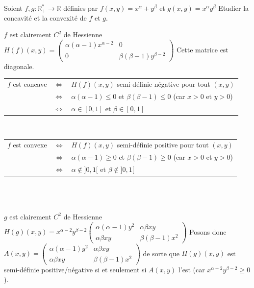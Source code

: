 \documentclass{fancybook}
\begin{document}
\begin{exercice}
Soient $f,g:\mathbb R^*_+\to \mathbb R$ définies par $f(x,y)=x^\alpha + y^\beta$ et $g(x,y)=x^{\alpha}y^{\beta}$\newline
Etudier la concavité et la convexité de $f$ et $g$.
\end{exercice}
$f$ est clairement $C^2$ de Hessienne $H(f)(x,y)=\begin{pmatrix}
\alpha(\alpha-1)x^{\alpha-2} & 0 \\
0 & \beta(\beta-1)y^{\beta-2}
\end{pmatrix}$\newline
Cette matrice est diagonale.\newline
\setlength{\tabcolsep}{0.1em}
\begin{tabular}{ccl}
$f$ est concave & $\iff$ & $H(f)(x,y)$ semi-définie négative pour tout $(x,y)$\\
& $\iff $ & $\alpha(\alpha-1)\leq 0$ et $\beta(\beta-1)\leq 0$ \quad (car $x>0$ et $y>0$)\\
& $\iff $ & $\alpha \in [0,1]$ et $\beta \in [0,1]$
\end{tabular}\newline
\\
\begin{tabular}{ccl}
$f$ est convexe & $\iff$ & $H(f)(x,y)$ semi-définie positive pour tout $(x,y)$\\
& $\iff $ & $\alpha(\alpha-1)\geq 0$ et $\beta(\beta-1)\geq 0$ \quad (car $x>0$ et $y>0$)\\
& $\iff $ & $\alpha \notin ]0,1[$ et $\beta \notin ]0,1[$
\end{tabular}\\
\\
\\
$g$ est clairement $C^2$ de Hessienne $H(g)(x,y)= x^{\alpha-2}y^{\beta-2} \begin{pmatrix}
\alpha (\alpha -1)y^2 & \alpha \beta xy \\
\alpha \beta xy & \beta(\beta -1)x^2
\end{pmatrix}$ \newline
Posons donc $A(x,y) = \begin{pmatrix}
\alpha (\alpha -1)y^2 & \alpha \beta xy \\
\alpha \beta xy & \beta(\beta -1)x^2
\end{pmatrix}$ de sorte que $H(g)(x,y)$ est semi-définie positive/négative si et seulement si $A(x,y)$ l'est (car $x^{\alpha-2}y^{\beta-2}\geq 0$).\newline \newline 
\end{document}
